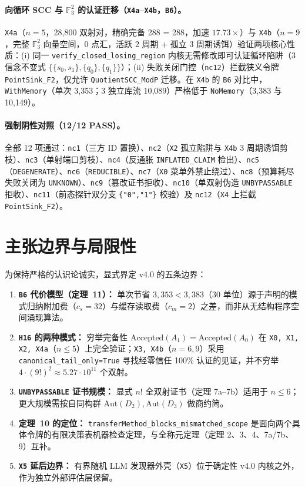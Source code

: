\documentclass[10pt,a4paper]{article}
\newcommand{\code}[1]{\nolinkurl{#1}}
\begin{document}
\paragraph{向循环 SCC 与 $\mathbb{F}_3^2$ 的认证迁移（\texttt{X4a}--\texttt{X4b}，\code{B6}）。}
\code{X4a}（$n=5$，28,800 双射对，精确完备 288 = 288，加速 $17.73\times$）与 \code{X4b}（$n=9$，完整 $\mathbb{F}_3^2$ 向量空间，0 点汇，活跃 2 周期 + 孤立 3 周期诱饵）验证两项核心性质：(i) 同一 \code{verify_closed_losing_region} 内核无需修改即可认证循环陷阱（3 信念不变式 $\{\{s_0,s_1\},\{q_0\},\{q_1\}\}$）；(ii) 失败关闭门控（\code{nc12}）拦截狭义令牌 \code{PointSink_F2}，仅允许 \code{QuotientSCC_ModP} 迁移。在 \code{X4b} 的 \code{B6} 对比中，\code{WithMemory}（单次 3,353；3 独立库流 10,089）严格低于 \code{NoMemory}（3,383 与 10,149）。

\paragraph{强制阴性对照（12/12 PASS）。}
全部 12 项通过：\code{nc1}（三方 ID 置换）、\code{nc2}（\code{X2} 孤立陷阱与 \code{X4b} 3 周期诱饵剪枝）、\code{nc3}（单射端口剪枝）、\code{nc4}（反通胀 \code{INFLATED_CLAIM} 检出）、\code{nc5}（\code{DEGENERATE}）、\code{nc6}（\code{REDUCIBLE}）、\code{nc7}（\code{X0} 菜单外禁止绕过）、\code{nc8}（预算耗尽失败关闭为 \code{UNKNOWN}）、\code{nc9}（篡改证书拒收）、\code{nc10}（单双射伪造 \code{UNBYPASSABLE} 拒收）、\code{nc11}（前态探针双分支 \texttt{\{"0","1"\}} 校验）及 \code{nc12}（\code{X4} 上拦截 \code{PointSink_F2}）。

\section{主张边界与局限性}

为保持严格的认识论诚实，显式界定 v4.0 的五条边界：
\begin{enumerate}
\item \textbf{\code{B6} 代价模型（定理~11）：} 单次节省 $3,353 < 3,383$（30 单位）源于声明的模式归纳附加费（$c_s = 32$）与缓存读取费（$c_m = 2$）之差，而非从无结构程序空间涌现算法。
\item \textbf{\code{H16} 的两种模式：} 穷举完备性 $\mathrm{Accepted}(A_1) = \mathrm{Accepted}(A_0)$ 在 \texttt{X0, X1, X2, X4a}（$n \le 5$）上完全验证；\texttt{X3, X4b}（$n=6,9$）采用 \code{canonical_tail_only=True} 寻找经零信任 100\% 认证的见证，并不穷举 $4\cdot(9!)^2 \approx 5.27\cdot 10^{11}$ 个双射。
\item \textbf{\code{UNBYPASSABLE} 证书规模：} 显式 $n!$ 全双射证书（定理 7a--7b）适用于 $n \le 6$；更大规模需按自同构群 $\mathrm{Aut}(D_2), \mathrm{Aut}(D_3)$ 做商约简。
\item \textbf{定理~10 的定位：} \code{transferMethod_blocks_mismatched_scope} 是面向两个具体令牌的有限决策表机器检查定理，与全称元定理（定理 2、3、4、7a/7b、9）互补。
\item \textbf{\code{X5} 延后边界：} 有界随机 LLM 发现器外壳（\code{X5}）位于确定性 v4.0 内核之外，作为独立外部评估层保留。
\end{enumerate}
\end{document}
